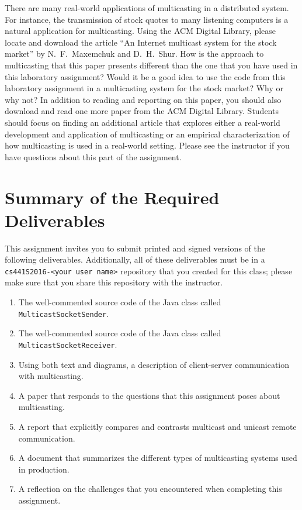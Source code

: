 There are many real-world applications of multicasting in a distributed system. For instance, the transmission of stock
quotes to many listening computers is a natural application for multicasting. Using the ACM Digital Library, please
locate and download the article ``An Internet multicast system for the stock market'' by N.\ F.\ Maxemchuk and D.\ H.\
Shur. How is the approach to multicasting that this paper presents different than the one that you have used in this
laboratory assignment? Would it be a good idea to use the code from this laboratory assignment in a multicasting system
for the stock market? Why or why not? In addition to reading and reporting on this paper, you should also download and
read one more paper from the ACM Digital Library. Students should focus on finding an additional article that explores
either a real-world development and application of multicasting or an empirical characterization of how multicasting is
used in a real-world setting. Please see the instructor if you have questions about this part of the assignment.

\section*{Summary of the Required Deliverables}

This assignment invites you to submit printed and signed versions of the following deliverables. Additionally,
all of these deliverables must be in a {\tt cs441S2016-<your user name>} repository that you created for this class;
please make sure that you share this repository with the instructor.

\vspace*{-.1in}

\begin{enumerate}
  \itemsep 0em

  \item The well-commented source code of the Java class called {\tt MulticastSocketSender}.

  \item The well-commented source code of the Java class called {\tt MulticastSocketReceiver}.

  \item Using both text and diagrams, a description of client-server communication with multicasting.

  \item A paper that responds to the questions that this assignment poses about multicasting.

  \item A report that explicitly compares and contrasts multicast and unicast remote communication.

  \item A document that summarizes the different types of multicasting systems used in production.

  \item A reflection on the challenges that you encountered when completing this assignment.

\end{enumerate}

